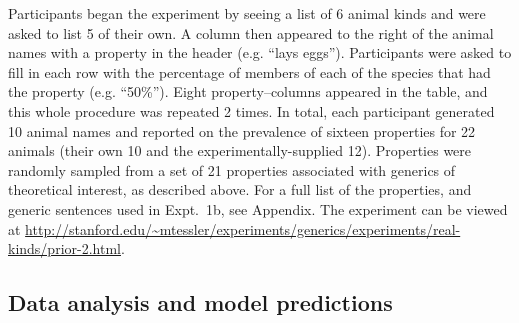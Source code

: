 \documentclass[12pt,letterpaper]{article}
\begin{document}
Participants began the experiment by seeing a list of 6 animal kinds and were asked to list 5 of their own.
A column then appeared to the right of the animal names with a property in the header (e.g. ``lays eggs'').
Participants were asked to fill in each row with the percentage of members of each of the species that had the property (e.g. ``50\%'').
Eight property--columns appeared in the table, and this whole procedure was repeated 2 times.
In total, each participant generated 10 animal names and reported on the prevalence of sixteen properties for 22 animals (their own 10 and the experimentally-supplied 12). 
Properties were randomly sampled from a set of 21 properties associated with generics of theoretical interest, as described above.
For a full list of the properties, and generic sentences used in Expt.~1b, see Appendix.
The experiment can be viewed at \url{http://stanford.edu/~mtessler/experiments/generics/experiments/real-kinds/prior-2.html}.

\subsection*{Data analysis and model predictions}
\end{document}
